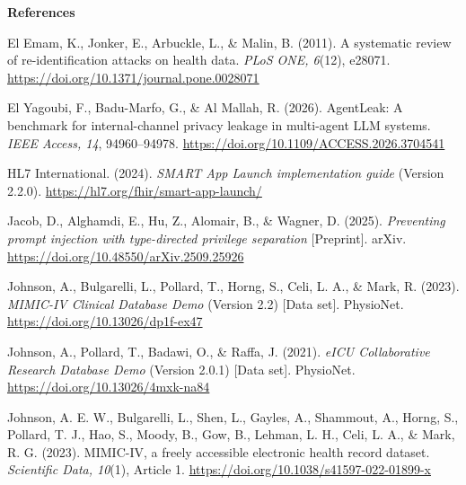 \FloatBarrier
\newpage
{}
{\centering\normalfont\bfseries\large References\par}
\nopagebreak

\begingroup
\sloppy
\setlength{\parindent}{0pt}

El Emam, K., Jonker, E., Arbuckle, L., \& Malin, B. (2011). A systematic review of re-identification
attacks on health data. \emph{PLoS ONE, 6}(12), e28071.
\url{https://doi.org/10.1371/journal.pone.0028071}\par

El Yagoubi, F., Badu-Marfo, G., \& Al Mallah, R. (2026). AgentLeak: A benchmark for internal-channel
privacy leakage in multi-agent LLM systems. \emph{IEEE Access, 14}, 94960--94978.
\url{https://doi.org/10.1109/ACCESS.2026.3704541}\par

HL7 International. (2024). \emph{SMART App Launch implementation guide} (Version 2.2.0).
\url{https://hl7.org/fhir/smart-app-launch/}\par

Jacob, D., Alghamdi, E., Hu, Z., Alomair, B., \& Wagner, D. (2025). \emph{Preventing prompt injection
with type-directed privilege separation} [Preprint]. arXiv.
\url{https://doi.org/10.48550/arXiv.2509.25926}\par

Johnson, A., Bulgarelli, L., Pollard, T., Horng, S., Celi, L. A., \& Mark, R. (2023). \emph{MIMIC-IV
Clinical Database Demo} (Version 2.2) [Data set]. PhysioNet.
\url{https://doi.org/10.13026/dp1f-ex47}\par

Johnson, A., Pollard, T., Badawi, O., \& Raffa, J. (2021). \emph{eICU Collaborative Research Database
Demo} (Version 2.0.1) [Data set]. PhysioNet. \url{https://doi.org/10.13026/4mxk-na84}\par

Johnson, A. E. W., Bulgarelli, L., Shen, L., Gayles, A., Shammout, A., Horng, S., Pollard, T. J., Hao,
S., Moody, B., Gow, B., Lehman, L. H., Celi, L. A., \& Mark, R. G. (2023). MIMIC-IV, a freely
accessible electronic health record dataset. \emph{Scientific Data, 10}(1), Article 1.
\url{https://doi.org/10.1038/s41597-022-01899-x}\par

